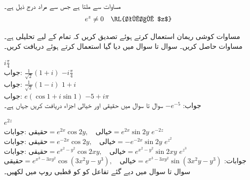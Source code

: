 مساوات  سے  ملتا ہے جس سے مراد درج ذیل ہے۔
\begin{align}
e^z\ne 0\quad \text{\RL{تمام $z$}}
\end{align}

\quad
مساوات کوشی ریمان استعمال کرتے ہوئے تصدیق کریں کہ  تمام  کے  لیے تحلیلی ہے۔
\quad
مساوات  حاصل کریں۔
سوال  تا سوال  میں دیا گیا  استعمال کرتے ہوئے   دریافت کریں۔

\quad
$i\tfrac{\pi}{4}$\\
جواب:\quad
$\tfrac{1}{\sqrt{2}}(1+i)$
\quad
$-i\tfrac{\pi}{4}$\\
جواب:\quad
$\tfrac{1}{\sqrt{2}}(1-i)$
\quad
$1+i$\\
جواب:\quad
$e(\cos 1+i\sin 1)$
\quad
$-5+i\pi$\\
جواب:\quad
$-e^{-5}$
سوال  تا سوال  میں حقیقی اور خیالی اجزاء دریافت کریں جہاں  ہے۔

\quad
$e^{2z}$\\
جوابات:\quad
$\text{حقیقی}=e^{2x}\cos 2y,\quad \text{خیالی}=e^{2x}\sin 2y$
\quad
$e^{-2z}$\\
جوابات:\quad
$\text{حقیقی}=e^{-2x}\cos 2y,\quad \text{خیالی}=-e^{-2x}\sin 2y$
\quad
$e^{z^2}$\\
جوابات:\quad
$\text{حقیقی}=e^{x^2-y^2}\cos 2xy,\quad \text{خیالی}=e^{x^2-y^2}\sin 2xy$
\quad
$e^{z^3}$\\
جوابات:\quad
$\text{حقیقی}=e^{x^3-3xy^2}\cos (3x^2y-y^3),\quad \text{خیالی}=e^{x^3-3xy^2}\sin (3x^2y-y^3)$
سوال  تا سوال  میں دیے گئے تفاعل کو  کو قطبی روپ میں لکھیں۔

